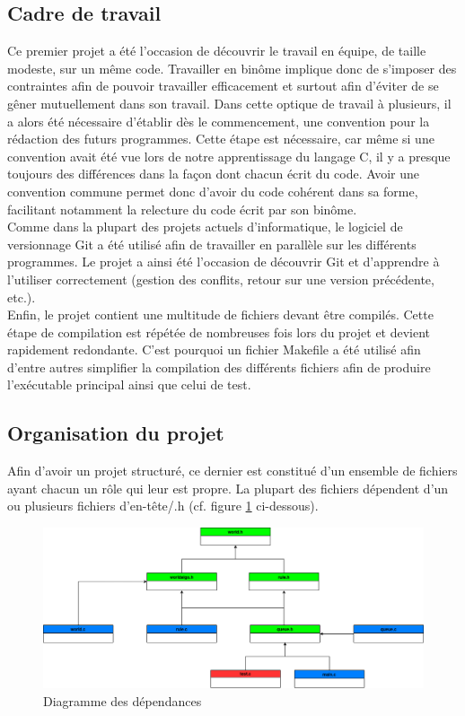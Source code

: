 \documentclass[a4paper]{article}
\begin{document}
\subsection{Cadre de travail}
\vspace{0.1cm}
Ce premier projet a été l'occasion de découvrir le travail en équipe, de taille modeste, sur un même code. Travailler en binôme implique donc de s'imposer des contraintes afin de pouvoir travailler efficacement et surtout afin d'éviter de se gêner mutuellement dans son travail. Dans cette optique de travail à plusieurs, il a alors été nécessaire d'établir dès le commencement, une convention pour la rédaction des futurs programmes. Cette étape est nécessaire, car même si une convention avait été vue lors de notre apprentissage du langage C, il y a presque toujours des différences dans la façon dont chacun écrit du code. Avoir une convention commune permet donc d'avoir du code cohérent dans sa forme, facilitant notamment la relecture du code écrit par son binôme.\\
\indent Comme dans la plupart des projets actuels d'informatique, le logiciel de versionnage Git a été utilisé afin de travailler en parallèle sur les différents programmes. Le projet a ainsi été l'occasion de découvrir Git et d'apprendre à l'utiliser correctement (gestion des conflits, retour sur une version précédente, etc.).\\
\indent Enfin, le projet contient une multitude de fichiers devant être compilés. Cette étape de compilation est répétée de nombreuses fois lors du projet et devient rapidement redondante. C'est pourquoi un fichier Makefile a été utilisé afin d'entre autres simplifier la compilation des différents fichiers afin de produire l'exécutable principal ainsi que celui de test.

\subsection{Organisation du projet}\label{sec:ORGA_PROJ}
\vspace{0.1cm}
Afin d'avoir un projet structuré, ce dernier est constitué d'un ensemble de fichiers ayant chacun un rôle qui leur est propre. La plupart des fichiers dépendent d'un ou plusieurs fichiers d'en-tête/.h (cf. figure \ref{fig:diag} ci-dessous).

\begin{figure}[ht]
    \centering
    \includegraphics[scale=0.4]{img/diagramme_dependance.png}
    \caption{Diagramme des dépendances}
    \label{fig:diag}
\end{figure}
\end{document}
